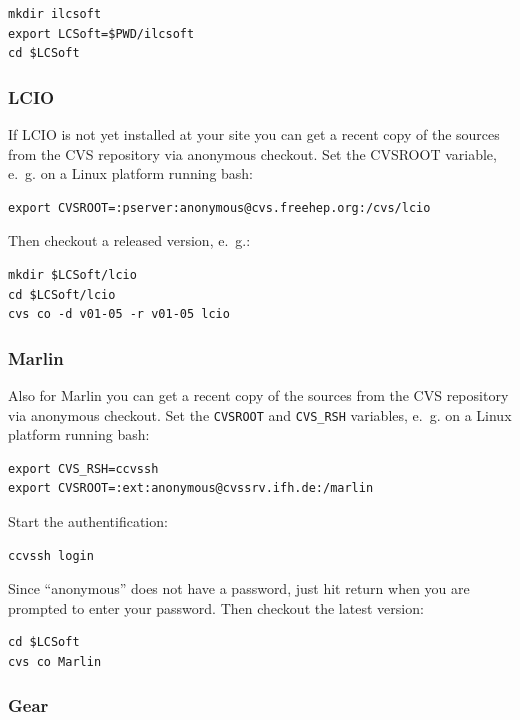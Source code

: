 \begin{verbatim}
mkdir ilcsoft 
export LCSoft=$PWD/ilcsoft
cd $LCSoft
\end{verbatim}

\subsubsection*{LCIO}

If LCIO is not yet installed at your site you can get a recent copy
of the sources from the CVS repository via anonymous checkout.
Set the CVSROOT variable, e.~g. on a Linux platform running bash:

\begin{verbatim}
export CVSROOT=:pserver:anonymous@cvs.freehep.org:/cvs/lcio
\end{verbatim}

Then checkout a released version, e.~g.:

\begin{verbatim}
mkdir $LCSoft/lcio 
cd $LCSoft/lcio 
cvs co -d v01-05 -r v01-05 lcio 
\end{verbatim}

\subsubsection*{Marlin}

Also for Marlin you can get a recent copy of the sources from the CVS 
repository via anonymous checkout.
Set the {\tt CVSROOT} and {\tt CVS\_RSH} variables, e.~g. on a Linux platform 
running bash:

\begin{verbatim}
export CVS_RSH=ccvssh 
export CVSROOT=:ext:anonymous@cvssrv.ifh.de:/marlin
\end{verbatim}

Start the authentification:

\begin{verbatim}
ccvssh login
\end{verbatim}

Since ``anonymous'' does not have a password, just hit return when you are
prompted to enter your password. Then checkout the latest version:

\begin{verbatim}
cd $LCSoft
cvs co Marlin
\end{verbatim}

\subsubsection*{Gear}

